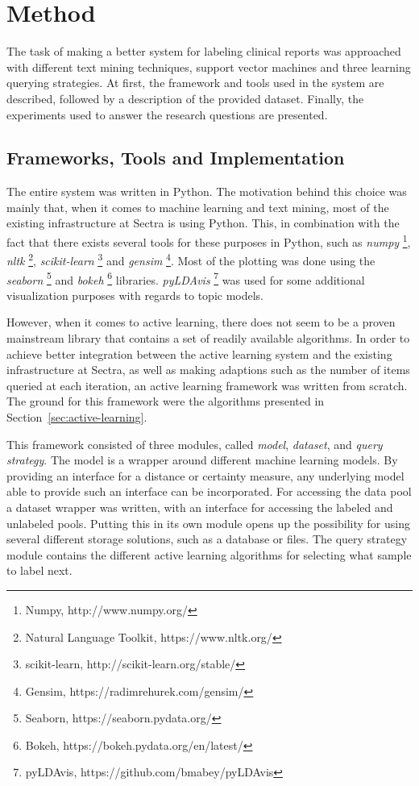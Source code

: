 \chapter{Method}
\label{cha:method}

The task of making a better system for labeling clinical reports was approached with different text mining techniques, support vector machines and three learning querying strategies.
At first, the framework and tools used in the system are described, followed by a description of the provided dataset.
Finally, the experiments used to answer the research questions are presented.

\section{Frameworks, Tools and Implementation}
The entire system was written in Python.
The motivation behind this choice was mainly that, when it comes to machine learning and text mining, most of the existing infrastructure at Sectra is using Python.
This, in combination with the fact that there exists several tools for these purposes in Python, such as \textit{numpy} \footnote{Numpy, http://www.numpy.org/}, \textit{nltk} \footnote{Natural Language Toolkit, https://www.nltk.org/}, \textit{scikit-learn} \footnote{scikit-learn, http://scikit-learn.org/stable/} and \textit{gensim} \footnote{Gensim, https://radimrehurek.com/gensim/}.
Most of the plotting was done using the \textit{seaborn} \footnote{Seaborn, https://seaborn.pydata.org/} and \textit{bokeh} \footnote{Bokeh, https://bokeh.pydata.org/en/latest/} libraries.
\textit{pyLDAvis} \footnote{pyLDAvis, https://github.com/bmabey/pyLDAvis} was used for some additional visualization purposes with regards to topic models.

However, when it comes to active learning, there does not seem to be a proven mainstream library that contains a set of readily available algorithms.
In order to achieve better integration between the active learning system and the existing infrastructure at Sectra, as well as making adaptions such as the number of items queried at each iteration, an active learning framework was written from scratch.
The ground for this framework were the algorithms presented in Section~\ref{sec:active-learning}.

This framework consisted of three modules, called \textit{model}, \textit{dataset}, and \textit{query strategy}.
The model is a wrapper around different machine learning models.
By providing an interface for a distance or certainty measure, any underlying model able to provide such an interface can be incorporated.
For accessing the data pool a dataset wrapper was written, with an interface for accessing the labeled and unlabeled pools.
Putting this in its own module opens up the possibility for using several different storage solutions, such as a database or files.
The query strategy module contains the different active learning algorithms for selecting what sample to label next.

